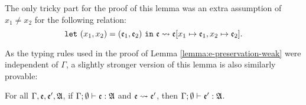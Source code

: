 The only tricky part for the proof of this lemma was an extra assumption of $x_1 \ne x_2$ for the following relation:
\[
\mathtt{let}\ (x_1,x_2)=(\e_1,\e_2)\ \mathtt{in}\ \e \leadsto \e[x_1 \mapsto \e_1, x_2 \mapsto \e_2].
\]

As the typing rules used in the proof of Lemma \ref{lemma:e-preservation-weak} were independent of $\Gamma$, a slightly stronger version of this lemma is also similarly provable:

\begin{lemma}
\label{lemma:e-preservation-stronger}
For all $\Gamma, \mathfrak{e}, \mathfrak{e}', \mathfrak{A}$, if $\Gamma; \emptyset \vdash \mathfrak{e} : \mathfrak{A}$ and $\mathfrak{e} \leadsto \mathfrak{e}'$, then $\Gamma; \emptyset \vdash \mathfrak{e}' : \mathfrak{A}$.
\end{lemma}